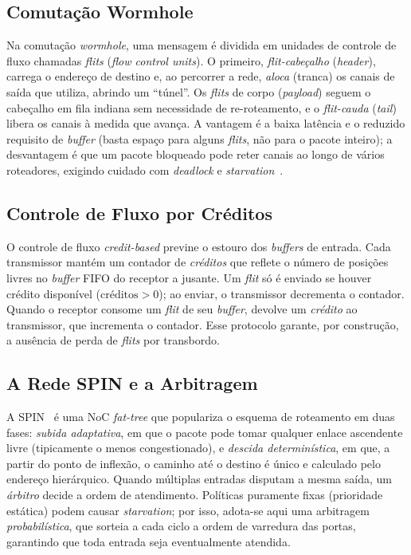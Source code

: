 \documentclass[conference]{IEEEtran}
\begin{document}
\subsection{Comutação Wormhole}
Na comutação \emph{wormhole}, uma mensagem é dividida em unidades de controle de
fluxo chamadas \emph{flits} (\emph{flow control units}). O primeiro,
\emph{flit-cabeçalho} (\emph{header}), carrega o endereço de destino e, ao
percorrer a rede, \emph{aloca} (tranca) os canais de saída que utiliza,
abrindo um ``túnel''. Os \emph{flits} de corpo (\emph{payload}) seguem o
cabeçalho em fila indiana sem necessidade de re-roteamento, e o \emph{flit-cauda}
(\emph{tail}) libera os canais à medida que avança. A vantagem é a baixa latência
e o reduzido requisito de \emph{buffer} (basta espaço para alguns \emph{flits},
não para o pacote inteiro); a desvantagem é que um pacote bloqueado pode reter
canais ao longo de vários roteadores, exigindo cuidado com \emph{deadlock} e
\emph{starvation}~\cite{dally2004principles}.

\subsection{Controle de Fluxo por Créditos}
O controle de fluxo \emph{credit-based} previne o estouro dos \emph{buffers} de
entrada. Cada transmissor mantém um contador de \emph{créditos} que reflete o
número de posições livres no \emph{buffer} FIFO do receptor a jusante. Um
\emph{flit} só é enviado se houver crédito disponível ($\text{créditos} > 0$);
ao enviar, o transmissor decrementa o contador. Quando o receptor consome um
\emph{flit} de seu \emph{buffer}, devolve um \emph{crédito} ao transmissor, que
incrementa o contador. Esse protocolo garante, por construção, a ausência de
perda de \emph{flits} por transbordo.

\subsection{A Rede SPIN e a Arbitragem}
A SPIN~\cite{guerrier2000spin} é uma NoC \emph{fat-tree} que populariza o esquema
de roteamento em duas fases: \emph{subida adaptativa}, em que o pacote pode tomar
qualquer enlace ascendente livre (tipicamente o menos congestionado), e
\emph{descida determinística}, em que, a partir do ponto de inflexão, o caminho
até o destino é único e calculado pelo endereço hierárquico. Quando múltiplas
entradas disputam a mesma saída, um \emph{árbitro} decide a ordem de atendimento.
Políticas puramente fixas (prioridade estática) podem causar \emph{starvation};
por isso, adota-se aqui uma arbitragem \emph{probabilística}, que sorteia a cada
ciclo a ordem de varredura das portas, garantindo que toda entrada seja
eventualmente atendida.
\end{document}
